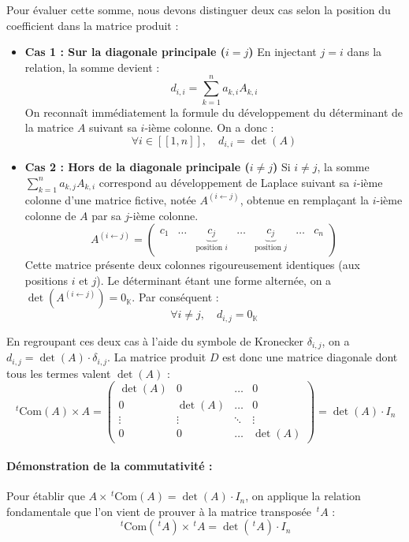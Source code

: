 \documentclass[11pt, a4paper]{article}
\theoremstyle{definition}
\begin{document}
Pour évaluer cette somme, nous devons distinguer deux cas selon la position du coefficient dans la matrice produit :

\begin{itemize}
	\item \textbf{Cas 1 : Sur la diagonale principale ($i = j$)}
	En injectant $j = i$ dans la relation, la somme devient :
	$$d_{i,i} = \sum_{k=1}^n a_{k,i} A_{k,i}$$
	On reconnaît immédiatement la formule du développement du déterminant de la matrice $A$ suivant sa $i$-ième colonne. On a donc :
	$$\forall i \in [\![1,n]\!], \quad d_{i,i} = \det(A)$$

	\item \textbf{Cas 2 : Hors de la diagonale principale ($i \neq j$)}
	Si $i \neq j$, la somme $\sum_{k=1}^n a_{k,j} A_{k,i}$ correspond au développement de Laplace suivant sa $i$-ième colonne d'une matrice fictive, notée $A^{(i \leftarrow j)}$, obtenue en remplaçant la $i$-ième colonne de $A$ par sa $j$-ième colonne.
	$$A^{(i \leftarrow j)} = \begin{pmatrix} c_1 & \dots & \underbrace{c_j}_{\text{position } i} & \dots & \underbrace{c_j}_{\text{position } j} & \dots & c_n \end{pmatrix}$$
	Cette matrice présente deux colonnes rigoureusement identiques (aux positions $i$ et $j$). Le déterminant étant une forme alternée, on a $\det(A^{(i \leftarrow j)}) = 0_\mathbb{K}$. Par conséquent :
	$$\forall i \neq j, \quad d_{i,j} = 0_\mathbb{K}$$
\end{itemize}

En regroupant ces deux cas à l'aide du symbole de Kronecker $\delta_{i,j}$, on a $d_{i,j} = \det(A) \cdot \delta_{i,j}$. La matrice produit $D$ est donc une matrice diagonale dont tous les termes valent $\det(A)$ :
$$\,^t\mathrm{Com}(A) \times A = \begin{pmatrix} \det(A) & 0 & \dots & 0 \\ 0 & \det(A) & \dots & 0 \\ \vdots & \vdots & \ddots & \vdots \\ 0 & 0 & \dots & \det(A) \end{pmatrix} = \det(A) \cdot I_n$$

\paragraph{Démonstration de la commutativité :}
Pour établir que $A \times \,^t\mathrm{Com}(A) = \det(A) \cdot I_n$, on applique la relation fondamentale que l'on vient de prouver à la matrice transposée $\,^tA$ :
$$\,^t\mathrm{Com}(\,^tA) \times \,^tA = \det(\,^tA) \cdot I_n$$
\end{document}
